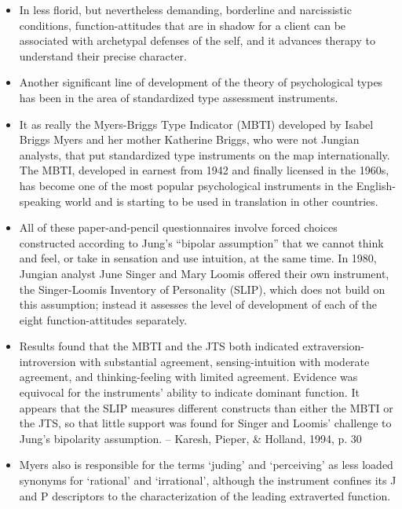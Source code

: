 \begin{itemize}
\item In less florid, but nevertheless demanding, borderline and narcissistic
conditions, function-attitudes that are in shadow for a client can be
associated with archetypal defenses of the self, and it advances therapy to
understand their precise character.

\item Another significant line of development of the theory of psychological
types has been in the area of standardized type assessment instruments.

\item It as really the Myers-Briggs Type Indicator (MBTI) developed by Isabel
Briggs Myers and her mother Katherine Briggs, who were not Jungian analysts,
that put standardized type instruments on the map internationally. The MBTI,
developed in earnest from 1942 and finally licensed in the 1960s, has become
one of the most popular psychological instruments in the English-speaking world
and is starting to be used in translation in other countries.

\item All of these paper-and-pencil questionnaires involve forced choices
constructed according to Jung's ``bipolar assumption'' that we cannot think and
feel, or take in sensation and use intuition, at the same time. In 1980,
Jungian analyst June Singer and Mary Loomis offered their own instrument, the
Singer-Loomis Inventory of Personality (SLIP), which does not build on this
assumption; instead it assesses the level of development of each of the eight
function-attitudes separately.

\item Results found that the MBTI and the JTS both indicated
extraversion-introversion with substantial agreement, sensing-intuition with
moderate agreement, and thinking-feeling with limited agreement.  Evidence was
equivocal for the instruments' ability to indicate dominant function. It
appears that the SLIP measures different constructs than either the MBTI or the
JTS, so that little support was found for Singer and Loomis' challenge to
Jung's bipolarity assumption. -- Karesh, Pieper, \& Holland, 1994, p. 30

\item Myers also is responsible for the terms `juding' and `perceiving' as less
loaded synonyms for `rational' and `irrational', although the instrument
confines its J and P descriptors to the characterization of the leading
extraverted function.


\end{itemize}
